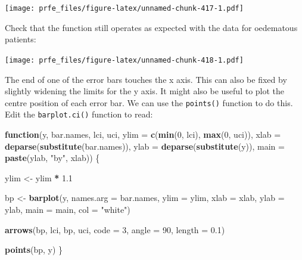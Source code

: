 \documentclass[12pt,a4paper]{book}
\newenvironment{Shaded}{\begin{snugshade}}{\end{snugshade}}
\newcommand{\KeywordTok}[1]{\textcolor[rgb]{0.13,0.29,0.53}{\textbf{#1}}}
\newcommand{\DataTypeTok}[1]{\textcolor[rgb]{0.13,0.29,0.53}{#1}}
\newcommand{\DecValTok}[1]{\textcolor[rgb]{0.00,0.00,0.81}{#1}}
\newcommand{\FloatTok}[1]{\textcolor[rgb]{0.00,0.00,0.81}{#1}}
\newcommand{\StringTok}[1]{\textcolor[rgb]{0.31,0.60,0.02}{#1}}
\newcommand{\ControlFlowTok}[1]{\textcolor[rgb]{0.13,0.29,0.53}{\textbf{#1}}}
\newcommand{\OperatorTok}[1]{\textcolor[rgb]{0.81,0.36,0.00}{\textbf{#1}}}
\newcommand{\NormalTok}[1]{#1}
\theoremstyle{definition}
\theoremstyle{definition}
\theoremstyle{definition}
\theoremstyle{remark}
\begin{document}
\texttt{[image: prfe\_files/figure-latex/unnamed-chunk-417-1.pdf]}

Check that the function still operates as expected with the data for
oedematous patients:

\begin{Shaded}
\end{Shaded}

\texttt{[image: prfe\_files/figure-latex/unnamed-chunk-418-1.pdf]}

The end of one of the error bars touches the x axis. This can also be
fixed by slightly widening the limits for the y axis. It might also be
useful to plot the centre position of each error bar. We can use the
\texttt{points()} function to do this. Edit the \texttt{barplot.ci()}
function to read:

\begin{Shaded}
\begin{Highlighting}[]
\ControlFlowTok{function}\NormalTok{(y, bar.names, lci, uci,}
         \DataTypeTok{ylim =} \KeywordTok{c}\NormalTok{(}\KeywordTok{min}\NormalTok{(}\DecValTok{0}\NormalTok{, lci), }\KeywordTok{max}\NormalTok{(}\DecValTok{0}\NormalTok{, uci)),}
         \DataTypeTok{xlab =} \KeywordTok{deparse}\NormalTok{(}\KeywordTok{substitute}\NormalTok{(bar.names)),}
         \DataTypeTok{ylab =} \KeywordTok{deparse}\NormalTok{(}\KeywordTok{substitute}\NormalTok{(y)),}
         \DataTypeTok{main =} \KeywordTok{paste}\NormalTok{(ylab, }\StringTok{"by"}\NormalTok{, xlab)) \{}
     
\NormalTok{  ylim <-}\StringTok{ }\NormalTok{ylim }\OperatorTok{*}\StringTok{ }\FloatTok{1.1}
     
\NormalTok{  bp <-}\StringTok{ }\KeywordTok{barplot}\NormalTok{(y, }\DataTypeTok{names.arg =}\NormalTok{ bar.names, }\DataTypeTok{ylim =}\NormalTok{ ylim, }\DataTypeTok{xlab =}\NormalTok{ xlab,}
                \DataTypeTok{ylab =}\NormalTok{ ylab, }\DataTypeTok{main =}\NormalTok{ main, }\DataTypeTok{col =} \StringTok{"white"}\NormalTok{)}
     
  \KeywordTok{arrows}\NormalTok{(bp, lci, bp, uci, }\DataTypeTok{code =} \DecValTok{3}\NormalTok{, }\DataTypeTok{angle =} \DecValTok{90}\NormalTok{, }\DataTypeTok{length =} \FloatTok{0.1}\NormalTok{)}
     
  \KeywordTok{points}\NormalTok{(bp, y)}
\NormalTok{\}}
\end{Highlighting}
\end{Shaded}
\end{document}

